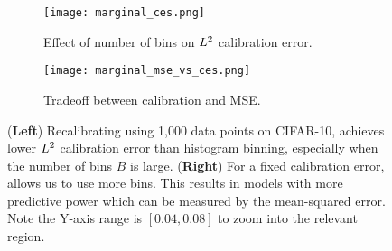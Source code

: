 \begin{figure}
  \centering
  \centering
     \begin{subfigure}[b]{0.54\textwidth}
         \centering
         \texttt{[image: marginal\_ces.png]}
         \caption{Effect of number of bins on $L^2{}$ calibration error.}
         \label{fig:marginal_calibrator_comparison_cifar}
     \end{subfigure}
     \hfill
     \begin{subfigure}[b]{0.44\textwidth}
         \centering
         \texttt{[image: marginal\_mse\_vs\_ces.png]}
         \caption{Tradeoff between calibration and MSE.}
         \label{fig:cifar_calibrator_cmp_mse_ce}
     \end{subfigure}
  \caption{
  (\textbf{Left}) Recalibrating using 1,000 data points on CIFAR-10, \ourcal{} achieves lower $L^2{}$ calibration error than histogram binning, especially when the number of bins $B$ is large.
  (\textbf{Right}) For a fixed calibration error, \ourcal{} allows us to use more bins. This results in models with more predictive power which can be measured by the mean-squared error. Note the Y-axis range is $[0.04, 0.08]$ to zoom into the relevant region.
  }
  \label{fig:nan2}
\end{figure}
